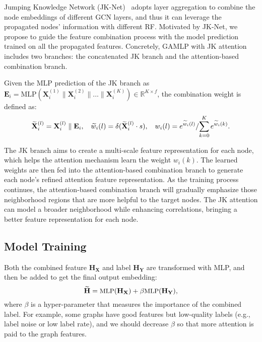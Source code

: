 \documentclass[sigconf]{acmart}
\begin{document}
Jumping Knowledge Network (JK-Net)~\citep{xu2018representation} adopts layer aggregation to combine the node embeddings of different GCN layers, and thus it can leverage the propagated nodes' information with different RF. Motivated by JK-Net, we propose to guide the feature combination process with the model prediction trained on all the propagated features.   
Concretely, GAMLP with JK attention includes two branches: the concatenated JK branch and the attention-based combination branch.
\begin{definition}
\label{df3}
Given the MLP prediction of the JK branch as $ \mathbf{E}_i = \text{MLP}(\mathbf{X}_i^{(1)}\parallel\mathbf{X}_i^{(2)}\parallel ... \parallel\mathbf{X}_i^{(K)}) \in \mathbb{R}^{K \times f}$, the combination weight is defined as:
\begin{equation}
\small
\label{iw2}
\widetilde{\mathbf{X}}_i^{(l)} = \mathbf{X}_i^{(l)} \parallel \mathbf{E}_i, \quad    {\widetilde{w}_{i}(l)} = \delta(\widetilde{\mathbf{X}}_i^{(l)} \cdot s), \quad  w_{i}(l) = {e^{\widetilde{w}_{i}(l)}}/{\sum \limits_{k=0}\limits^{K} e^{\widetilde{w}_{i}(k)}}.
\end{equation}
\end{definition}
The JK branch aims to create a multi-scale feature representation for each node, which helps the attention mechanism learn the weight $w_i(k)$.
The learned weights are then fed into the attention-based combination branch to generate each node's refined attention feature representation.
As the training process continues, the attention-based combination branch will gradually 
emphasize those neighborhood regions that are more helpful to the target nodes.
The JK attention can model a broader neighborhood while enhancing correlations, bringing a better feature representation for each node.






















\subsection{Model Training}
Both the combined feature $\mathbf{H}_{\mathbf{X}}$ and label $\mathbf{H}_{\mathbf{Y}}$ are transformed with MLP, and then be added to get the final output embedding:
\begin{equation}
\small
    \widetilde{\mathbf{H}} = \text{MLP}(\mathbf{H}_{\mathbf{X}}) + \beta\text{MLP}(\mathbf{H}_{\mathbf{Y}}),
\end{equation}
where $\beta$ is a hyper-parameter that measures the importance of the combined label. For example, some graphs have good features but low-quality labels (e.g., label noise or low label rate), and we should decrease $\beta$ so that more attention is paid to the graph features.
\end{document}
